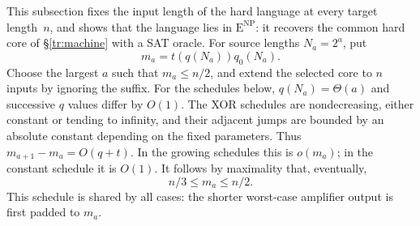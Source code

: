 \documentclass[11pt,letterpaper]{article}
\theoremstyle{definition}
\theoremstyle{remark}
\newcommand{\ENP}{\mathrm{E}^{\mathrm{NP}}}
\begin{document}
This subsection fixes the input length of the hard language at every
target length~$n$, and shows that the language lies in $\ENP$: it
recovers the common hard core of \S\ref{tr:machine} with a SAT oracle.
For source lengths $N_a=2^a$, put
\[
 m_a=t(q(N_a))q_0(N_a).
\]
Choose the largest $a$ such that $m_a\le n/2$, and extend the selected
core to $n$ inputs by ignoring the suffix. For the schedules below,
$q(N_a)=\Theta(a)$ and successive $q$ values differ by $O(1)$.
The XOR schedules are nondecreasing, either constant or tending to
infinity, and their adjacent jumps are bounded by an absolute constant
depending on the fixed parameters. Thus $m_{a+1}-m_a=O(q+t)$.
In the growing schedules this is $o(m_a)$; in the constant schedule
it is $O(1)$. It follows by maximality that, eventually,
\begin{equation}
 n/3\le m_a\le n/2.
 \label{tr:envelope}
\end{equation}
This schedule is shared by all cases: the shorter worst-case
amplifier output is first padded to $m_a$.
\end{document}
